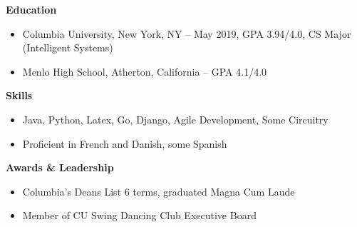 \documentclass{article}
\begin{document}

\noindent
{\large\textbf{Education}}
\begin{itemize}[noitemsep]
    \item Columbia University, New York, NY -- May 2019, GPA 3.94/4.0, CS Major (Intelligent Systems)
    \item Menlo High School, Atherton, California -- GPA 4.1/4.0
\end{itemize}

\noindent
{\large\textbf{Skills}}
\begin{itemize}[noitemsep]
    \item Java, Python, Latex, Go, Django, Agile Development, Some Circuitry
    \item Proficient in French and Danish, some Spanish
\end{itemize}
\noindent
{\large\textbf{Awards \& Leadership}}
\begin{itemize}[noitemsep]
    \item Columbia's Deans List 6 terms, graduated Magna Cum Laude
    \item Member of CU Swing Dancing Club Executive Board

\end{itemize}
\end{document}
